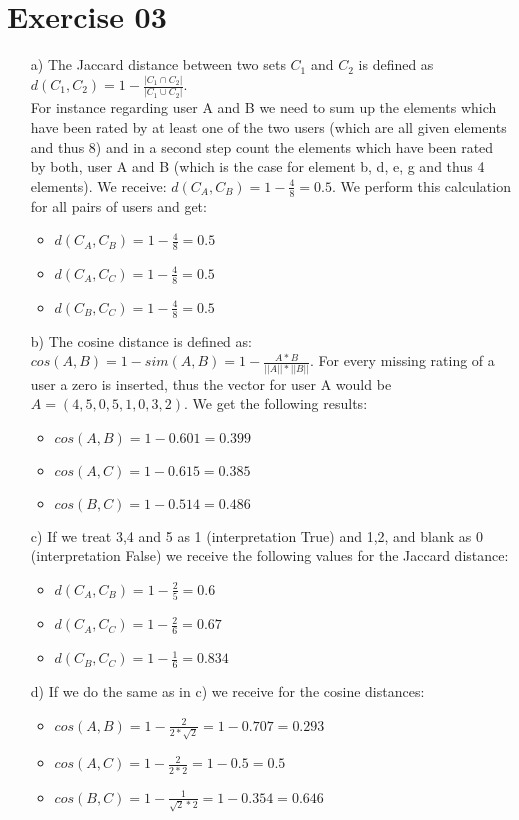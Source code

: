 \documentclass[11pt,a4paper]{scrartcl}
\begin{document}
\section*{Exercise 03}
\begin{itemize}
	\item[a)] The Jaccard distance between two sets $C_1$ and $C_2$ is defined as $d(C_1, C_2) = 1 - \frac{|C_1 \cap C_2| }{|C_1 \cup C_2|}$. \\
	For instance regarding user A and B we need to sum up the elements which have been rated by at least one of the two users (which are all given elements and thus 8) and in a second step count the elements which have been rated by both, user A and B (which is the case for element b, d, e, g and thus 4 elements). We receive: $d(C_A, C_B) = 1 - \frac{4}{8} = 0.5$. We perform this calculation for all pairs of users and get:
	\begin{itemize}
		\item $d(C_A, C_B) = 1 - \frac{4}{8} = 0.5$
		\item $d(C_A, C_C) = 1 - \frac{4}{8} = 0.5$
		\item $d(C_B, C_C) = 1 - \frac{4}{8} = 0.5$
	\end{itemize}

	\item[b)] The cosine distance is defined as: $cos(A,B) = 1 - sim(A,B) =  1- \frac{A*B}{||A|| * ||B||}$. For every missing rating of a user a zero is inserted, thus the vector for user A would be $A = (4,5,0,5,1,0,3,2)$. We get the following results:
	\begin{itemize}
		\item $cos(A,B) = 1 - 0.601 = 0.399$
		\item $cos(A,C) = 1 - 0.615 = 0.385$
		\item $cos(B,C) = 1 -0.514 = 0.486$
	\end{itemize}

	\item[c)] If we treat 3,4 and 5 as 1 (interpretation True) and 1,2, and blank as 0 (interpretation False) we receive the following values for the Jaccard distance:
	\begin{itemize}
		\item $d(C_A, C_B) = 1 - \frac{2}{5} = 0.6$
		\item $d(C_A, C_C) = 1 - \frac{2}{6} = 0.67$
		\item $d(C_B, C_C) = 1 - \frac{1}{6} = 0.834$
	\end{itemize}
	\item[d)] If we do the same as in c) we receive for the cosine distances:
	\begin{itemize}
		\item $cos(A,B) = 1- \frac{2}{2*\sqrt{2}} = 1 - 0.707 = 0.293$
		\item $cos(A,C) = 1- \frac{2}{2*2} = 1 - 0.5 = 0.5$
		\item $cos(B,C) = 1- \frac{1}{\sqrt{2}*2} = 1 - 0.354 = 0.646$
	\end{itemize}
	

\end{itemize}
\end{document}
